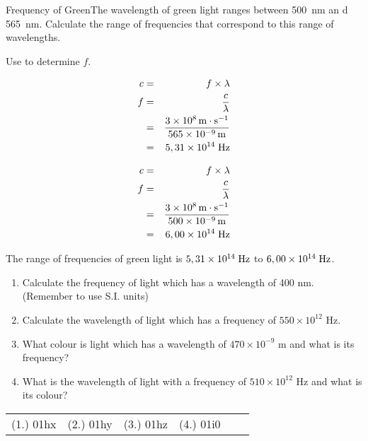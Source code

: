 \begin{wex}
{Frequency of Green}{The wavelength of green light ranges between 500~nm an d 565~nm. Calculate the range of frequencies that correspond to this range of wavelengths.}{
Use 
to determine $f$.

\begin{eqnarray*}
c &=& f \times \lambda\\
f&=&\frac{c}{\lambda}\\
&=&\frac{3 \times 10^8 \,\mathrm{m \cdot s^{-1}}}{565 \times 10^{-9}\,\rm{m}}\\
&=&5,31 \times 10^{14}\;\rm{Hz}
\end{eqnarray*}

\begin{eqnarray*}
c &=& f \times \lambda\\
f&=&\frac{c}{\lambda}\\
&=&\frac{3 \times 10^8 \,\mathrm{m \cdot s^{-1}}}{500 \times 10^{-9}\,\rm{m}}\\
&=&6,00 \times 10^{14}\;\rm{Hz}
\end{eqnarray*}

The range of frequencies of green light is $5,31 \times 10^{14}\;\rm{Hz}$ to $6,00 \times 10^{14}\;\rm{Hz}$.
}
\end{wex}

{
\begin{enumerate}
\item Calculate the frequency of light which has a wavelength of 400 nm. (Remember to use S.I. units)
\item Calculate the wavelength of light which has a frequency of $550\times 10^{12}$ Hz.
\item What colour is light which has a wavelength of $470\times 10^{-9}$ m and what is its frequency?
\item What is the wavelength of light with a frequency of $510 \times 10^{12}$ Hz and what is its colour?
\end{enumerate}

\par \practiceinfo
\par \begin{tabular}[h]{cccccc}
(1.)	01hx	&
(2.)	01hy	&
(3.)	01hz	&
(4.)	01i0	&
\end{tabular}
}

